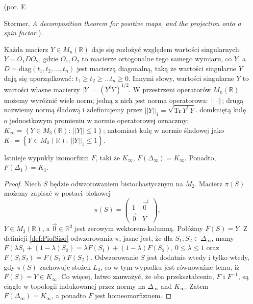 (por. E\,{St{\o}rmer, \emph{A decomposition theorem for positive maps, and the projection onto a spin factor}
\cite{stormer2013decomposition}).

Każda macierz $Y \in M_{n}(\mathbb{R})$ daje się rozłożyć względem wartości singularnych:
$Y = O_{1} D O_{2}$, gdzie
$O_{1}, O_{2}$ to macierze ortogonalne tego samego wymiaru, co $Y$, a
$D = \text{diag}(t_{1}, t_{2}, \ldots, t_{n})$ jest macierzą diagonalną,
taką że wartości singularne $Y$ dają się uporządkować:
$t_{1} \geq t_{2} \geq \ldots t_{n} \geq 0$.
Innymi słowy, wartości singularne $Y$ to wartości własne macierzy
$|Y| = (Y^{t} Y)^{1/2}$.
W przestrzeni operatorów $M_{n}(\mathbb{R})$ możemy wyróżnić wiele norm;
jedną z nich jest norma operatorowa: $|| \cdot ||$;
drugą nazwiemy normą śladową i zdefiniujemy przez
$||Y||_{1} = \sqrt{\text{Tr} \, Y^{t} \, Y }$.
domkniętą kulę o jednostkowym promieniu w normie operatorowej oznaczmy:
$K_{\infty} = \left \{ Y \in M_{3}(\mathbb{R}): \, ||Y|| \leq 1 \right \}$;
natomiast kulę w normie śladowej jako
$K_{1} = \left \{ Y \in M_{3}(\mathbb{R}): \, ||Y||_{1} \leq 1 \right \}$.

\begin{Theorem}
\label{thm:Ball}
Istnieje wypukły izomorfizm $F$, taki że $K_{\infty}$, $F(\Delta_{\infty}) = K_{\infty}$.
Ponadto, $F(\Delta_{1}) = K_{1}$.
\end{Theorem}
\begin{proof}
Niech $S$ będzie odwzorowaniem bistochastycznym na $M_{2}$.
Macierz $\pi(S)$ możemy zapisać w postaci blokowej
\begin{equation}
\label{eq:Sbistochastic}
\pi(S) = \begin{pmatrix}
    1  &  \vec{0}^{t} \\
    \vec{0} & Y
    \end{pmatrix},
\end{equation}
$Y \in M_{3}(\mathbb{R})$,
a $\vec{0} \in \mathbb{R}^{3}$ jest zerowym wektorem-kolumną.
Połóżmy $F(S) = Y$.
Z definicji \eqref{def:PiofSiso}
odwzorowania $\pi$,
jasne jest, że dla  $S_{1}, S_{2} \in \Delta_{\infty}$,
mamy $F \left( \lambda S_{1} + (1-\lambda) S_{2} \right) =
 \lambda F(S_{1}) + (1-\lambda) F(S_{2})$,
$0 \leq \lambda \leq 1$
oraz $F(S_{1} S_{2}) = F(S_{1}) F(S_{2})$.
Odwzorowanie $S$ jest dodatnie wtedy i tylko wtedy, gdy
$\pi(S)$ zachowuje stożek $L_{4}$,
co w tym wypadku jest równoważne temu, iż $F(S) = Y \in K_{\infty}$.
Co więcej, łatwo zauważyć, że oba przekształcenia, $F$ i $F^{-1}$,
są ciągłe w topologii indukowanej przez normy na
$\Delta_{\infty}$ and $K_{\infty}$.
Zatem $F(\Delta_{\infty}) = K_{\infty}$, a ponadto $F$ jest homeomorfizmem.


\end{proof}}
